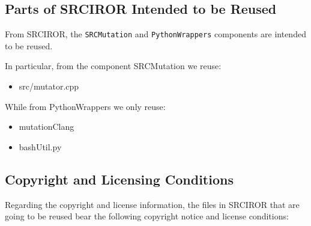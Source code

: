 \subsection{Parts of SRCIROR Intended to be Reused}


From SRCIROR, the \texttt{SRCMutation} and \texttt{PythonWrappers} components are intended to be reused. 

In particular, from the component SRCMutation we reuse:
\begin{itemize}
	\item src/mutator.cpp
\end{itemize}

While from PythonWrappers we only reuse:

\begin{itemize}
	\item mutationClang
	\item bashUtil.py
\end{itemize}

\subsection{Copyright and Licensing Conditions}

Regarding the copyright and license information, the files in SRCIROR that are going to be reused bear the following copyright notice and license conditions:

